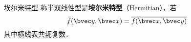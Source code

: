 
\begin{definition}{埃尔米特型}
称半双线性型是\textbf{埃尔米特型}（Hermitian），若
\begin{equation}
f(\bvec y,\bvec x)=\overline{f(\bvec x,\bvec y)}
\end{equation}
其中横线表共轭复数．
\end{definition}